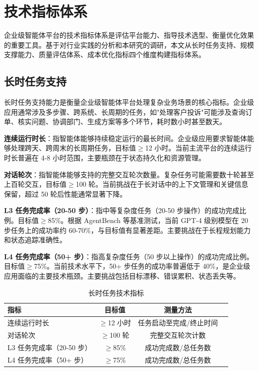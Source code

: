\documentclass[12pt,a4paper]{article}
\begin{document}
\section{技术指标体系}
\label{sec:metrics}

企业级智能体平台的技术指标体系是评估平台能力、指导技术选型、衡量优化效果的重要工具。基于对行业实践的分析和本研究的调研，本文从长时任务支持、规模支撑能力、质量评估体系、成本优化指标四个维度构建指标体系。

\subsection{长时任务支持}

长时任务支持能力是衡量企业级智能体平台处理复杂业务场景的核心指标。企业级应用通常涉及多步骤、跨系统、长周期的任务，如"处理客户投诉"可能涉及查询订单、核实问题、协调部门、生成方案等多个环节，耗时数小时甚至数天。

\textbf{连续运行时长}：指智能体能够持续稳定运行的最长时间。企业级应用要求智能体能够处理跨天、跨周末的长周期任务，目标值$\geq$12 小时。当前主流平台的连续运行时长普遍在 4-8 小时范围，主要瓶颈在于状态持久化和资源管理。

\textbf{对话轮次}：指智能体能够支持的完整交互轮次数量。复杂任务可能需要数十轮甚至上百轮交互，目标值$\geq$100 轮。当前挑战在于长对话中的上下文管理和关键信息保留，超过 50 轮后性能通常显著下降。

\textbf{L3 任务完成率（20-50 步）}：指中等复杂度任务（20-50 步操作）的成功完成比例。目标值$\geq$85\%。根据 AgentBench 等基准测试，当前 GPT-4 级别模型在 20 步任务上的成功率约 60-70\%，与目标值有显著差距。主要挑战在于长程规划能力和状态追踪准确性。

\textbf{L4 任务完成率（50+ 步）}：指高复杂度任务（50 步以上操作）的成功完成比例。目标值$\geq$75\%。当前技术水平下，50+ 步任务的成功率普遍低于 40\%，是企业级应用面临的主要技术瓶颈。主要挑战包括目标漂移、错误累积、状态丢失等。

\begin{table}[h]
\centering
\caption{长时任务技术指标}
\label{tab:longtask}
\begin{tabular}{@{}lccl@{}}
\toprule
\textbf{指标} & \textbf{目标值} & \textbf{测量方法} \\
\midrule
连续运行时长 & $\geq$12 小时 & 任务启动至完成/终止时间 \\
对话轮次 & $\geq$100 轮 & 完整交互轮次计数 \\
L3 任务完成率（20-50 步） & $\geq$85\% & 成功完成数/总任务数 \\
L4 任务完成率（50+ 步） & $\geq$75\% & 成功完成数/总任务数 \\
\bottomrule
\end{tabular}
\end{table}
\end{document}
